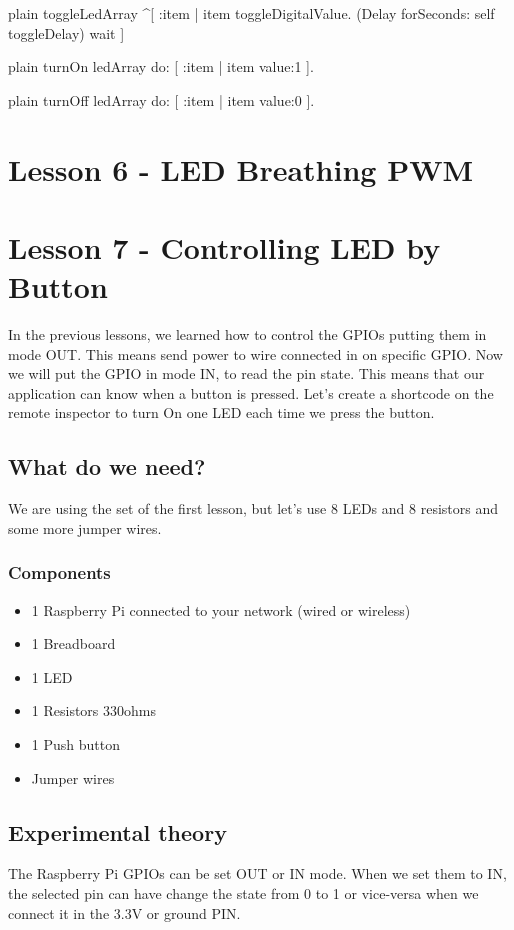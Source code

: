 \documentclass[10pt,twoside,english]{_support/latex/sbabook/sbabook}
\begin{document}
\begin{displaycode}{plain}
toggleLedArray
	^[ :item | item toggleDigitalValue. (Delay forSeconds: self toggleDelay) wait ]
\end{displaycode}

\begin{displaycode}{plain}
turnOn
	ledArray do: [ :item | item value:1 ].
\end{displaycode}

\begin{displaycode}{plain}
turnOff
	ledArray do: [ :item | item value:0 ].
\end{displaycode}
\chapter{Lesson 6 - LED Breathing PWM}\chapter{Lesson 7 - Controlling LED by Button}
In the previous lessons, we learned how to control the GPIOs putting them in mode OUT. This means send power to wire connected in on specific GPIO. Now we will put the GPIO in mode IN, to read the pin state. This means that our application can know when a button is pressed. Let’s create a shortcode on the remote inspector to turn On one LED each time we press the button.
\section{What do we need?}
We are using the set of the first lesson, but let's use 8 LEDs and 8 resistors and some more jumper wires.
\subsection{Components}
\begin{itemize}
\item 1 Raspberry Pi connected to your network (wired or wireless)
\item 1 Breadboard
\item 1 LED
\item 1 Resistors 330ohms
\item 1 Push button
\item Jumper wires
\end{itemize}
\section{Experimental theory}
The Raspberry Pi GPIOs can be set OUT or IN mode. When we set them to IN, the selected pin can have change the state from 0 to 1 or vice-versa when we connect it in the 3.3V or ground PIN.
\end{document}
